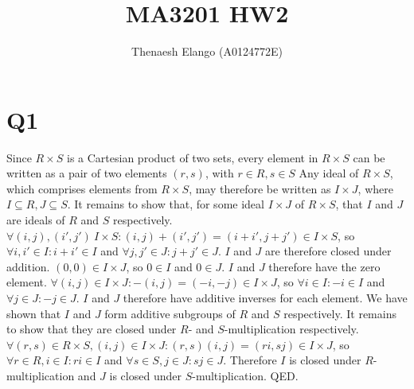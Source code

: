 \documentclass[]{article}
\title{MA3201 HW2}
\author{Thenaesh Elango (A0124772E)}
\begin{document}
\maketitle

\newcommand{\series}{\ensuremath{\sum_{n = 0}^{\infty}}}

\section*{Q1}
	Since $R \times S$ is a Cartesian product of two sets, every element in $R \times S$ can be written as a pair of two elements $(r, s)$, with $r \in R, s \in S$\newline
	Any ideal of $R \times S$, which comprises elements from $R \times S$, may therefore be written as $I \times J$, where $I \subseteq R, J \subseteq S$.\newline
	It remains to show that, for some ideal $I \times J$ of $R \times S$, that $I$ and $J$ are ideals of $R$ and $S$ respectively.\newline\newline
	$\forall (i, j), (i', j') \ I \times S: (i, j) + (i', j') = (i + i', j + j') \in I \times S$, so $\forall i, i' \in I: i + i' \in I$ and $\forall j, j' \in J: j + j' \in J$. $I$ and $J$ are therefore closed under addition.\newline\newline
	$(0, 0) \in I \times J$, so $0 \in I$ and $0 \in J$. $I$ and $J$ therefore have the zero element.\newline\newline
	$\forall (i, j) \in I \times J: -(i, j) = (-i, -j) \in I \times J$, so $\forall i \in I: -i \in I$ and $\forall j \in J: -j \in J$. $I$ and $J$ therefore have additive inverses for each element.\newline\newline
	We have shown that $I$ and $J$ form additive subgroups of $R$ and $S$ respectively. It remains to show that they are closed under $R$- and $S$-multiplication respectively.\newline\newline
	$\forall (r, s) \in R \times S, (i, j) \in I \times J: (r, s)(i, j) = (ri, sj) \in I \times J$, so $\forall r \in R, i \in I: ri \in I$ and $\forall s \in S, j \in J: sj \in J$. Therefore $I$ is closed under $R$-multiplication and $J$ is closed under $S$-multiplication.\newline\newline
	QED.
\end{document}
